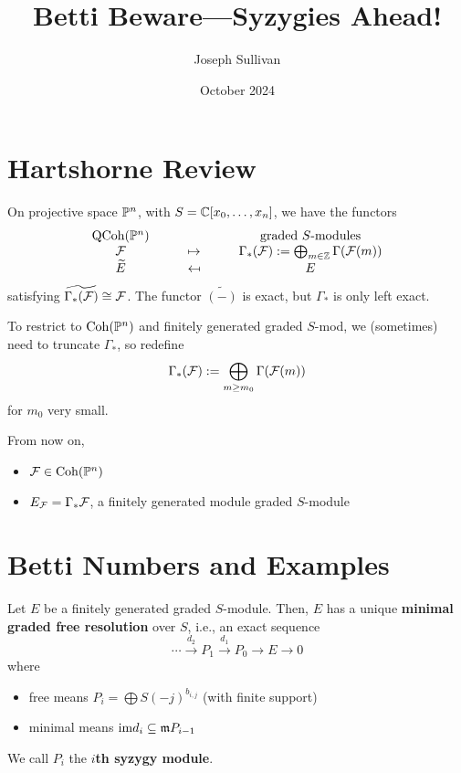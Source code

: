 \documentclass[12pt]{article}
\title{Betti Beware---Syzygies Ahead!}
\author{Joseph Sullivan}
\date{October 2024}
\begin{document}
\maketitle

\section{Hartshorne Review}

On projective space $\P^n$, with $S=\C[x_0,\dots,x_n]$, we have the functors
\[
\begin{array}{ccc}
    \QCoh(\P^n) & & \text{graded $S$-modules}\\
     \cF & \qquad\mapsto\qquad & \Gamma_*(\cF) \defeq \bigoplus_{m\in \Z} \Gamma(\cF(m))\\
     \tilde{E} & \mapsfrom & E
\end{array}
\]
satisfying $\tilde{\Gamma_*(\cF)} \cong \cF$. The functor $\tilde{(-)}$ is exact, but $\Gamma_*$ is only left exact.

To restrict to $\Coh(\P^n)$ and finitely generated graded $S$-mod, we (sometimes) need to truncate $\Gamma_*$, so redefine
\[\Gamma_*(\cF) \defeq \bigoplus_{m\geq m_0} \Gamma(\cF(m))\]
for $m_0$ very small.

From now on, 
\begin{itemize}
    \item $\cF\in \Coh(\P^n)$
    \item $E_\cF = \Gamma_* \cF$, a finitely generated module graded $S$-module
\end{itemize}

\section{Betti Numbers and Examples}

\begin{thmdef}
    Let $E$ be a finitely generated graded $S$-module. Then, $E$ has a unique \textbf{minimal graded free resolution} over $S$, i.e., an exact sequence
    \[\cdots \xrightarrow{d_2} P_1 \xrightarrow{d_1} P_0 \to E \to 0\]
    where
    \begin{itemize}
        \item free means $P_i = \bigoplus S(-j)^{b_{i,j}}$ (with finite support)
        \item minimal means $\im d_i \subseteq \fm P_{i-1}$
    \end{itemize}
    We call $P_i$ the \textbf{$i$th syzygy module}.
\end{thmdef}
\end{document}
